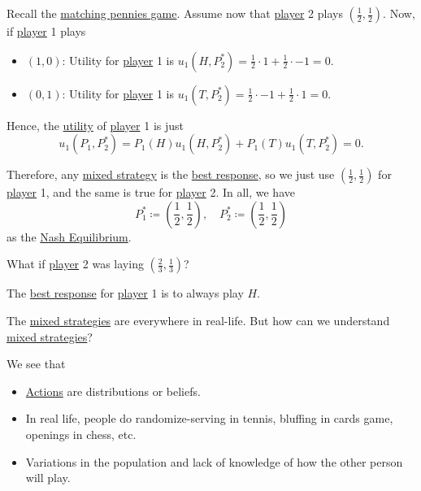 \begin{prev}
	Recall the \hyperref[eg:matching-pennies]{matching pennies game}. Assume now that \hyperref[def:player]{player} 2 plays \((\frac{1}{2}, \frac{1}{2})\). Now, if \hyperref[def:player]{player} 1 plays
	\begin{itemize}
		\item \((1, 0)\): Utility for \hyperref[def:player]{player} 1 is \(u_1(H, P^{\ast}_2) = \frac{1}{2}\cdot 1 + \frac{1}{2}\cdot -1 = 0\).
		\item \((0, 1)\): Utility for \hyperref[def:player]{player} 1 is \(u_1(T, P^{\ast}_2) = \frac{1}{2}\cdot -1 + \frac{1}{2}\cdot 1 = 0\).
	\end{itemize}
	Hence, the \hyperref[def:reward]{utility} of \hyperref[def:player]{player} 1 is just
	\[
		u_1(P_1, P^{\ast}_2) = P_1(H)u_1(H, P^{\ast}_2)+P_1(T)u_1(T, P^{\ast}_2) = 0.
	\]

	Therefore, any \hyperref[def:mixed-strategy]{mixed strategy} is the \hyperref[def:best-response]{best response}, so we just use
	\((\frac{1}{2}, \frac{1}{2})\) for \hyperref[def:player]{player} 1, and the same is true for \hyperref[def:player]{player} 2. In all, we have
	\[
		P_1^{\ast}\coloneqq \left(\frac{1}{2}, \frac{1}{2}\right), \quad P_2^{\ast}\coloneqq \left(\frac{1}{2}, \frac{1}{2}\right)
	\]
	as the \hyperref[def:Nash-equilibrium]{Nash Equilibrium}.

	\begin{problem}
	What if \hyperref[def:player]{player} 2 was laying \(\left(\frac{2}{3}, \frac{1}{3}\right)\)?
	\end{problem}
	\begin{answer}
		The \hyperref[def:best-response]{best response} for \hyperref[def:player]{player} 1 is to always play \(H\).
	\end{answer}
\end{prev}

\begin{problem}
The \hyperref[def:mixed-strategy]{mixed strategies} are everywhere in real-life. But how can we understand \hyperref[def:mixed-strategy]{mixed strategies}?
\end{problem}
\begin{answer}
	We see that
	\begin{itemize}
		\item \hyperref[def:strategy]{Actions} are distributions or beliefs.
		\item In real life, people do randomize-serving in tennis, bluffing in cards game, openings in chess, etc.
		\item Variations in the population and lack of knowledge of how the other person will play.
	\end{itemize}
\end{answer}

